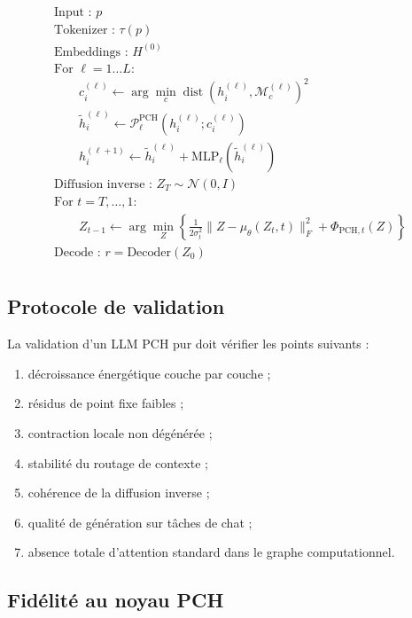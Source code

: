 \documentclass[11pt]{article}
\providecommand{\Ppch}{\mathcal P^{\mathrm{PCH}}}
\begin{document}
\[
\boxed{
\begin{array}{l}
\text{Input : } p \\
\text{Tokenizer : } \tau(p) \\
\text{Embeddings : } H^{(0)} \\
\text{For }\ell=1\ldots L:\\
\qquad c_i^{(\ell)} \leftarrow \arg\min_c \operatorname{dist}(h_i^{(\ell)},\mathcal M_c^{(\ell)})^2\\
\qquad \tilde h_i^{(\ell)} \leftarrow \Ppch_\ell(h_i^{(\ell)};c_i^{(\ell)})\\
\qquad h_i^{(\ell+1)} \leftarrow \tilde h_i^{(\ell)}+\mathrm{MLP}_\ell(\tilde h_i^{(\ell)})\\
\text{Diffusion inverse : } Z_{T}\sim \mathcal N(0,I) \\
\text{For }t=T,\dots,1:\\
\qquad Z_{t-1}\leftarrow \arg\min_Z\left\{\frac1{2\sigma_t^2}\|Z-\mu_\theta(Z_t,t)\|_F^2+\Phi_{\mathrm{PCH},t}(Z)\right\} \\
\text{Decode : } r = \mathrm{Decoder}(Z_0) \\
\end{array}
}
\]

\subsection{Protocole de validation}

La validation d'un LLM PCH pur doit vérifier les points suivants :
\begin{enumerate}[leftmargin=2em]
    \item décroissance énergétique couche par couche ;
    \item résidus de point fixe faibles ;
    \item contraction locale non dégénérée ;
    \item stabilité du routage de contexte ;
    \item cohérence de la diffusion inverse ;
    \item qualité de génération sur tâches de chat ;
    \item absence totale d'attention standard dans le graphe computationnel.
\end{enumerate}

\subsection{Fidélité au noyau PCH}
\end{document}
